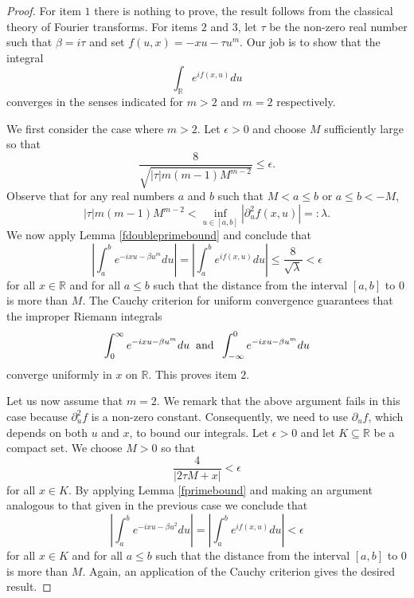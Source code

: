 \documentclass{article}
\theoremstyle{theorem}
\theoremstyle{remark}
\begin{document}
\begin{proof}

For item $1$ there is nothing to prove, the result follows from the classical theory of Fourier transforms. For items $\mathit{2}$ and $\mathit{3}$, let $\tau$ be the non-zero real number such that $\beta=i\tau$ and set $f(u,x)=-xu-\tau u^m$. Our job is to show that the integral
\begin{equation*}
 \int_{\mathbb{R}}e^{if(x,u)}du
\end{equation*}
converges in the senses indicated for $m>2$ and $m=2$ respectively. 

We first consider the case where $m>2$. Let $\epsilon>0$ and choose $M$ sufficiently large so that
\begin{equation}\label{Mepsilonrelation}
 \frac{8}{\sqrt{|\tau|m(m-1)M^{m-2}}}\leq\epsilon.
\end{equation}
Observe that for any real numbers $a$ and $b$ such that $M< a\leq b$ or $a\leq b< -M$,
\begin{equation*}
|\tau|m(m-1)M^{m-2}< \inf_{u\in[a,b]}|\partial_{u}^2 f(x,u)|=:\lambda.
\end{equation*} We now apply Lemma \ref{fdoubleprimebound} and conclude that
\begin{equation*}
\left|\int_a^be^{-ixu-\beta u^m}du\right|=\left|\int_a^be^{if(x,u)}du\right|\leq\frac{8}{\sqrt{\lambda}}<\epsilon
\end{equation*}
for all $x\in\mathbb{R}$ and for all $a\leq b$ such that the distance from the interval $[a,b]$ to $0$ is more than $M$.  The Cauchy criterion for uniform convergence guarantees that the improper Riemann integrals
\begin{equation*}
 \int_0^{\infty}e^{-ixu-\beta u^m}du\hspace{.2cm}\text{and}\hspace{.2cm}\int_{-\infty}^0e^{-ixu-\beta u^m}du
\end{equation*}
converge uniformly in $x$ on $\mathbb{R}$. This proves item $\mathit{2}$.

Let us now assume that $m=2$. We remark that the above argument fails in this case because $\partial_{u}^2 f$ is a non-zero constant. Consequently, we need to use $\partial_{u} f$, which depends on both $u$ and $x$, to bound our integrals. Let $\epsilon>0$ and let $K\subseteq \mathbb{R}$ be a compact set. We choose $M>0$ so that 
\begin{equation*}
 \frac{4}{|2\tau M+x|}<\epsilon
\end{equation*}
for all $x\in K$. By applying Lemma \ref{fprimebound} and making an argument analogous to that given in the previous case we conclude that
\begin{equation*}
\left|\int_a^be^{-ixu-\beta u^2}du\right|=\left|\int_a^be^{if(x,u)}du\right|<\epsilon
\end{equation*}
for all $x\in K$ and for all $a\leq b$ such that the distance from the interval $[a,b]$ to $0$ is more than $M$.  Again, an application of the Cauchy criterion gives the desired result.
\end{proof}
\end{document}
